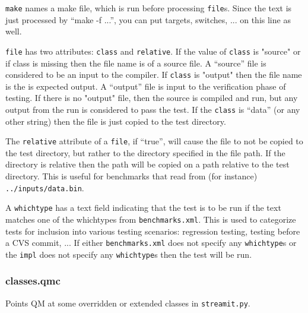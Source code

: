 \documentclass[11pt]{article}
\begin{document}
{\tt make} names a make file, which is run before processing {\tt file}s.
Since the text is just processed by ``make -f ...'', you can put targets, 
switches, ... on this line as well.

{\tt file} has two attributes: {\tt class} and {\tt relative}.  
If the value of {\tt class}
is "source" or if class is missing then the file name is of a source
file. A ``source'' file is considered to be an input to the compiler.
 If {\tt class} is "output" then the file name is the is expected
output. A ``output'' file is input to the verification phase of testing.
If there is no "output" file, then the source is compiled and
run, but any output from the run is considered to pass the test.
If the {\tt class} is ``data'' (or any other string) then the file is just 
copied to the test directory. 

The {\tt relative} attribute of a {\tt file}, if ``true'', will cause the 
file to not be copied to the test directory, but rather to the directory
specified in the file path.  If the directory is relative then the path will
be copied on a path relative to the test directory.  This is useful for
benchmarks that read from (for instance) {\tt ../inputs/data.bin}. 


A {\tt whichtype} has a text field indicating that the test is to be run
if the text matches one of the whichtypes from {\tt benchmarks.xml}.
This is used to categorize tests for inclusion into various testing
scenarios: regression testing, testing before a CVS commit, ... 
If either {\tt benchmarks.xml} does not specify any {\tt whichtype}s
or the {\tt impl} does not specify any {\tt whichtype}s then the test
will be run.

\subsubsection{classes.qmc}
Points QM at some overridden or extended classes in {\tt streamit.py}.
\end{document}
